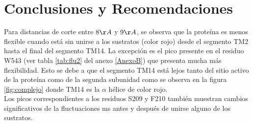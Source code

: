 \chapter{Conclusiones y Recomendaciones}\label{ch:5}
Para distancias de corte entre $8\AA$ y $9\AA$, se observa que la prote\'{i}na  es menos flexible cuando est\'{a} sin unirse a los sustratos (color rojo) desde el segmento TM2 hasta el final del segmento TM14. La excepci\'{o}n es el pico presente en el residuo W543 (ver tabla \ref{tab:flu2} del anexo \ref{AnexoB}) que presenta mucha m\'{a}s flexibilidad. Esto se debe a que el segmento TM14 est\'{a} lejos tanto del sitio activo de la prote\'{i}na como de la segunda subunidad como se observa en la figura \ref{fig:complejo} donde TM14 es la $\alpha$ h\'{e}lice de color rojo.\\

Los picos correspondientes a los residuos S209 y F210 tambi\'{e}n muestran cambios significativos de la fluctuaciones ms antes y despu\'{e}s de unirse alguno de los sustratos.
